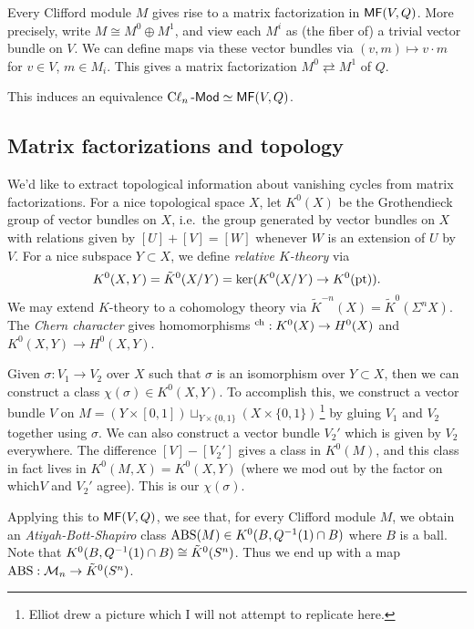 \documentclass{article}
\begin{document}
Every Clifford module $M$ gives rise to a matrix factorization in $\mathsf{MF}(V, Q)$.
More precisely, write $M \cong M^0 \oplus M^1$, and view each $M^i$ as (the fiber of) a trivial vector bundle on $V$.
We can define maps via these vector bundles via $(v, m) \mapsto v \cdot m$ for $v \in V$, $m \in M_i$.
This gives a matrix factorization $M^0 \rightleftarrows M^1$ of $Q$.

\begin{thm}
	This induces an equivalence $\operatorname{C\ell}_n\text{-}\mathsf{Mod} \simeq \mathsf{MF}(V, Q)$.
\end{thm}

\subsection{Matrix factorizations and topology}

We'd like to extract topological information about vanishing cycles from matrix factorizations.
For a nice topological space $X$, let $K^0(X)$ be the Grothendieck group of vector bundles on $X$, i.e.\ the group generated by vector bundles on $X$ with relations given by $[U] + [V] = [W]$ whenever $W$ is an extension of $U$ by $V$.
For a nice subspace $Y \subset X$, we define \emph{relative $K$-theory} via 
\[
	K^0(X, Y) = \tilde{K}^0(X / Y) = \ker(K^0(X / Y) \to K^0(\operatorname{pt})).
\]
We may extend $K$-theory to a cohomology theory via $\tilde{K}^{-n}(X) = \tilde{K}^0(\Sigma^n X)$.
The \emph{Chern character} gives homomorphisms $^{\mathrm{ch}}: K^0(X) \to H^0(X)$ and $K^0(X, Y) \to H^0(X, Y)$.

Given $\sigma: V_1 \to V_2$ over $X$ such that $\sigma$ is an isomorphism over $Y \subset X$, then we can construct a class $\chi(\sigma) \in K^0(X, Y)$.
To accomplish this, we construct a vector bundle $V$ on $M = (Y \times [0, 1]) \sqcup_{Y \times \{0, 1\}} (X \times \{0, 1\})$\,\footnote{Elliot drew a picture which I will not attempt to replicate here.} by gluing $V_1$ and $V_2$ together using $\sigma$.
We can also construct a vector bundle $V_2'$ which is given by $V_2$ everywhere.
The difference $[V] - [V_2']$ gives a class in $K^0(M)$, and this class in fact lives in $K^0(M, X) = K^0(X, Y)$ (where we mod out by the factor on which$V$ and $V_2'$ agree).
This is our $\chi(\sigma)$.

Applying this to $\mathsf{MF}(V, Q)$, we see that, for every Clifford module $M$, we obtain an \emph{Atiyah-Bott-Shapiro} class $\operatorname{ABS}(M) \in K^0(B, Q^{-1}(1) \cap B)$ where $B$ is a ball.
Note that $K^0(B, Q^{-1}(1) \cap B) \cong \tilde{K}^0(S^n)$.
Thus we end up with a map $\operatorname{ABS}: \mathcal{M}_n \to \tilde{K}^0(S^n)$.
\end{document}
